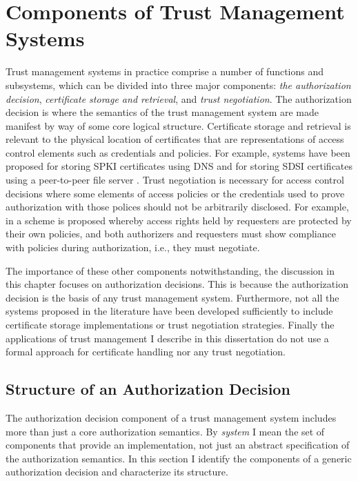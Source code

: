 \section{Components of Trust Management Systems}
\label{section-components}

Trust management systems in practice comprise a number of functions and subsystems, which can be
divided into three major components: \emph{the authorization decision}, \emph{certificate
  storage and retrieval}, and \emph{trust negotiation}. The authorization decision is where the
semantics of the trust management system are made manifest by way of some core logical
structure. Certificate storage and retrieval is relevant to the physical location of
certificates that are representations of access control elements such as credentials and
policies. For example, systems have been proposed for storing SPKI certificates using DNS
\cite{nikander98storing} and for storing SDSI certificates using a peer-to-peer file server
\cite{ajmani02conchord}. Trust negotiation
\cite{Winsborough:ATN,Yu:PECSATNI,Seamons:LDACPATN,Yu:ISATN,Winsborough:TPATN,Winsborough:SATN}
is necessary for access control decisions where some elements of access policies or the
credentials used to prove authorization with those polices should not be arbitrarily disclosed.
For example, in \cite{Winsborough:ATN} a scheme is proposed whereby access rights held by
requesters are protected by their own policies, and both authorizers and requesters must show
compliance with policies during authorization, i.e., they must negotiate.

The importance of these other components notwithstanding, the discussion in this chapter focuses
on authorization decisions. This is because the authorization decision is the basis of any trust
management system. Furthermore, not all the systems proposed in the literature have been
developed sufficiently to include certificate storage implementations or trust negotiation
strategies. Finally the applications of trust management I describe in this dissertation do not
use a formal approach for certificate handling nor any trust negotiation.

\subsection{Structure of an Authorization Decision}
\label{section-components-structure}

The authorization decision component of a trust management system includes more than just a core
authorization semantics. By \emph{system} I mean the set of components that provide an
implementation, not just an abstract specification of the authorization semantics. In this
section I identify the components of a generic authorization decision and characterize its
structure.

